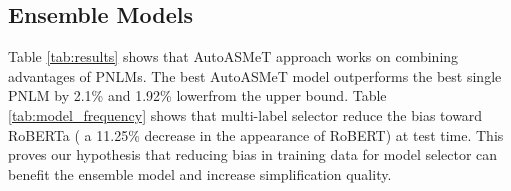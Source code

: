 \documentclass[11pt]{article}
\begin{document}

\subsection{Ensemble Models}

Table \ref{tab:results} shows that AutoASMeT approach works on combining advantages of PNLMs. The best AutoASMeT model outperforms the best single PNLM by 2.1\% and 1.92\% lowerfrom the upper bound. Table \ref{tab:model_frequency} shows that multi-label selector reduce the bias toward RoBERTa ( a 11.25\% decrease in the appearance of RoBERT) at test time. This proves our hypothesis that reducing bias in training data for model selector can benefit the ensemble model and increase simplification quality. 

\begin{table}[t]
\centering
{}
\caption{The appearance frequency of PNLMs (in percentage).} 
\label{tab:model_frequency}
\end{table}  
\end{document}
